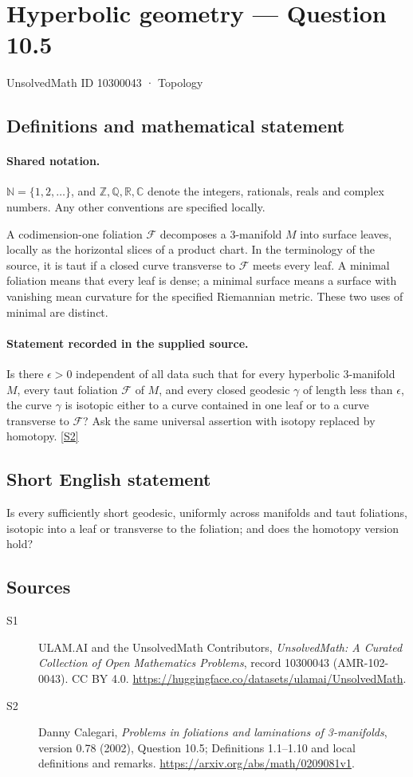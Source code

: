 \documentclass[11pt]{article}
\newcommand{\sref}[2]{\hyperlink{source:#1:#2}{[S#2]}}
\begin{document}
\setcounter{section}{10300042}
\section{Hyperbolic geometry — Question 10.5}\label{10300043}
{\small\sffamily UnsolvedMath ID 10300043 · Topology}
\subsection{Definitions and mathematical statement}

\paragraph{Shared notation.}$\mathbb N=\{1,2,\ldots\}$, and $\mathbb Z,\mathbb Q,\mathbb R,\mathbb C$ denote the integers, rationals, reals and complex numbers. Any other conventions are specified locally.


A codimension-one foliation $\mathcal F$ decomposes a $3$-manifold $M$ into surface leaves, locally as the horizontal slices of a product chart. In the terminology of the source, it is taut if a closed curve transverse to $\mathcal F$ meets every leaf. A minimal foliation means that every leaf is dense; a minimal surface means a surface with vanishing mean curvature for the specified Riemannian metric. These two uses of minimal are distinct.
\paragraph{Statement recorded in the supplied source.}
Is there $\epsilon>0$ independent of all data such that for every hyperbolic $3$-manifold $M$, every taut foliation $\mathcal F$ of $M$, and every closed geodesic $\gamma$ of length less than $\epsilon$, the curve $\gamma$ is isotopic either to a curve contained in one leaf or to a curve transverse to $\mathcal F$? Ask the same universal assertion with isotopy replaced by homotopy. \sref{10300043}{2}
\subsection{Short English statement}
Is every sufficiently short geodesic, uniformly across manifolds and taut foliations, isotopic into a leaf or transverse to the foliation; and does the homotopy version hold?
\subsection{Sources}
\begin{description}
\item[\hypertarget{source:10300043:1}{S1}] ULAM.AI and the UnsolvedMath Contributors, \emph{UnsolvedMath: A Curated Collection of Open Mathematics Problems}, record 10300043 (AMR-102-0043). CC BY 4.0. \url{https://huggingface.co/datasets/ulamai/UnsolvedMath}.
\item[\hypertarget{source:10300043:2}{S2}] Danny Calegari, \emph{Problems in foliations and laminations of 3-manifolds}, version 0.78 (2002), Question 10.5; Definitions 1.1--1.10 and local definitions and remarks. \url{https://arxiv.org/abs/math/0209081v1}.
\end{description}
\label{end:10300043}
\end{document}
